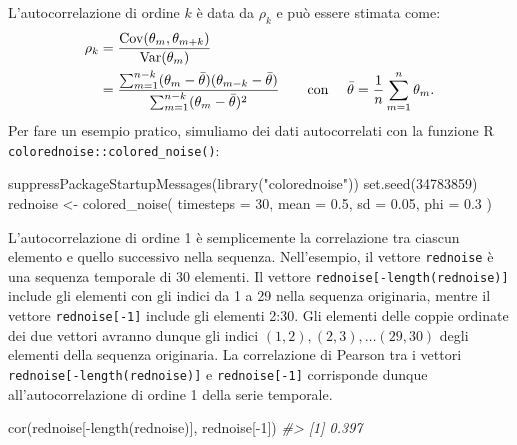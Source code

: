 \documentclass[
  10pt,
  italian,
  a4paper,
  extrafontsizes,onecolumn,openright
  ]{memoir}
\newenvironment{Shaded}{\begin{snugshade}}{\end{snugshade}}
\newcommand{\AttributeTok}[1]{\textcolor[rgb]{0.77,0.63,0.00}{#1}}
\newcommand{\CommentTok}[1]{\textcolor[rgb]{0.56,0.35,0.01}{\textit{#1}}}
\newcommand{\DecValTok}[1]{\textcolor[rgb]{0.00,0.00,0.81}{#1}}
\newcommand{\FloatTok}[1]{\textcolor[rgb]{0.00,0.00,0.81}{#1}}
\newcommand{\FunctionTok}[1]{\textcolor[rgb]{0.00,0.00,0.00}{#1}}
\newcommand{\NormalTok}[1]{#1}
\newcommand{\OtherTok}[1]{\textcolor[rgb]{0.56,0.35,0.01}{#1}}
\newcommand{\SpecialCharTok}[1]{\textcolor[rgb]{0.00,0.00,0.00}{#1}}
\newcommand{\StringTok}[1]{\textcolor[rgb]{0.31,0.60,0.02}{#1}}
\DeclareMathOperator{\Var}{Var} %
\DeclareMathOperator{\Cov}{Cov} %
\begin{document}
L'autocorrelazione di ordine \(k\) è data da \(\rho_k\) e può essere stimata come:
\begin{align}
\rho_k &= \frac{\Cov(\theta_m, \theta_{m+k})}{\Var(\theta_m)}\notag\\
&= \frac{\sum_{m=1}^{n-k}(\theta_m - \bar{\theta})(\theta_{m-k} - \bar{\theta})}{\sum_{m=1}^{n-k}(\theta_m - \bar{\theta})^2} \qquad\text{con }\quad \bar{\theta} = \frac{1}{n}\sum_{m=1}^{n}\theta_m.
\label{eq:autocor}
\end{align}
Per fare un esempio pratico, simuliamo dei dati autocorrelati con la funzione R \texttt{colorednoise::colored\_noise()}:

\begin{Shaded}
\begin{Highlighting}[]
\FunctionTok{suppressPackageStartupMessages}\NormalTok{(}\FunctionTok{library}\NormalTok{(}\StringTok{"colorednoise"}\NormalTok{))}
\FunctionTok{set.seed}\NormalTok{(}\DecValTok{34783859}\NormalTok{)}
\NormalTok{rednoise }\OtherTok{\textless{}{-}} \FunctionTok{colored\_noise}\NormalTok{(}
  \AttributeTok{timesteps =} \DecValTok{30}\NormalTok{, }\AttributeTok{mean =} \FloatTok{0.5}\NormalTok{, }\AttributeTok{sd =} \FloatTok{0.05}\NormalTok{, }\AttributeTok{phi =} \FloatTok{0.3}
\NormalTok{)}
\end{Highlighting}
\end{Shaded}

L'autocorrelazione di ordine 1 è semplicemente la correlazione tra ciascun elemento e quello successivo nella sequenza. Nell'esempio, il vettore \texttt{rednoise} è una sequenza temporale di 30 elementi. Il vettore \texttt{rednoise{[}-length(rednoise){]}} include gli elementi con gli indici da 1 a 29 nella sequenza originaria, mentre il vettore \texttt{rednoise{[}-1{]}} include gli elementi 2:30. Gli elementi delle coppie ordinate dei due vettori avranno dunque gli indici \((1, 2), (2, 3), \dots (29, 30)\) degli elementi della sequenza originaria. La correlazione di Pearson tra i vettori \texttt{rednoise{[}-length(rednoise){]}} e \texttt{rednoise{[}-1{]}} corrisponde dunque all'autocorrelazione di ordine 1 della serie temporale.

\begin{Shaded}
\begin{Highlighting}[]
\FunctionTok{cor}\NormalTok{(rednoise[}\SpecialCharTok{{-}}\FunctionTok{length}\NormalTok{(rednoise)], rednoise[}\SpecialCharTok{{-}}\DecValTok{1}\NormalTok{])}
\CommentTok{\#\textgreater{} [1] 0.397}
\end{Highlighting}
\end{Shaded}
\end{document}
